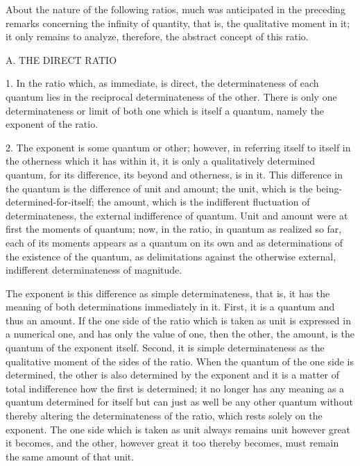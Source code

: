 About the nature of the following ratios,
much was anticipated in the preceding remarks
concerning the infinity of quantity, that is,
the qualitative moment in it;
it only remains to analyze, therefore,
the abstract concept of this ratio.

A. THE DIRECT RATIO

1. In the ratio which, as immediate, is direct,
the determinateness of each quantum lies in
the reciprocal determinateness of the other.
There is only one determinateness or limit of both
one which is itself a quantum,
namely the exponent of the ratio.

2. The exponent is some quantum or other;
however, in referring itself to itself
in the otherness which it has within it,
it is only a qualitatively determined quantum,
for its difference, its beyond and otherness, is in it.
This difference in the quantum is the difference of unit and amount;
the unit, which is the being-determined-for-itself;
the amount, which is the indifferent fluctuation of determinateness,
the external indifference of quantum.
Unit and amount were at first the moments of quantum;
now, in the ratio, in quantum as realized so far,
each of its moments appears as a quantum on its own
and as determinations of the existence of the quantum,
as delimitations against the otherwise
external, indifferent determinateness of magnitude.

The exponent is this difference as simple determinateness,
that is, it has the meaning of both
determinations immediately in it.
First, it is a quantum and thus an amount.
If the one side of the ratio which is taken as
unit is expressed in a numerical one,
and has only the value of one,
then the other, the amount, is
the quantum of the exponent itself.
Second, it is simple determinateness as
the qualitative moment of the sides of the ratio.
When the quantum of the one side is determined,
the other is also determined by the exponent
and it is a matter of total indifference
how the first is determined;
it no longer has any meaning
as a quantum determined for itself
but can just as well be any other
quantum without thereby altering
the determinateness of the ratio,
which rests solely on the exponent.
The one side which is taken as unit always
remains unit however great it becomes,
and the other, however great it too thereby becomes,
must remain the same amount of that unit.

